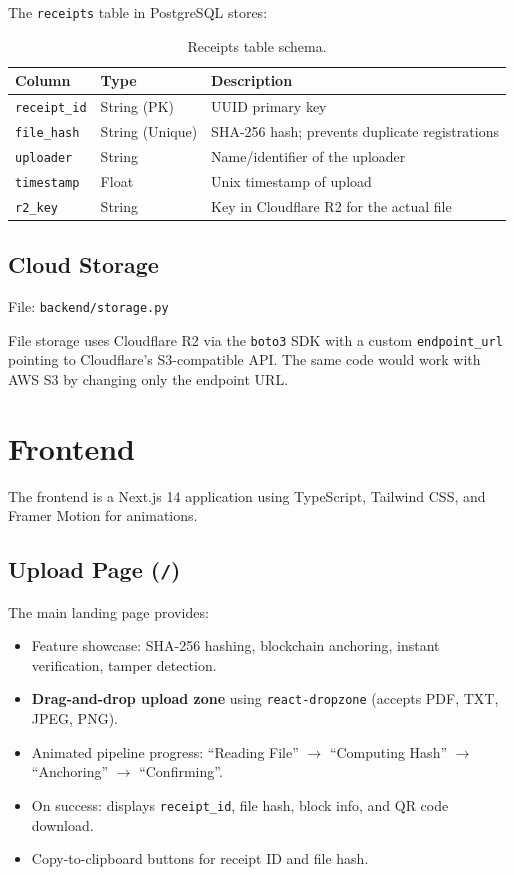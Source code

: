 \documentclass[12pt, a4paper]{report}
\begin{document}
The \texttt{receipts} table in PostgreSQL stores:

\begin{table}[H]
\centering
\begin{tabularx}{\textwidth}{l l X}
\toprule
\textbf{Column} & \textbf{Type} & \textbf{Description} \\
\midrule
\texttt{receipt\_id} & String (PK) & UUID primary key \\
\texttt{file\_hash} & String (Unique) & SHA-256 hash; prevents duplicate registrations \\
\texttt{uploader} & String & Name/identifier of the uploader \\
\texttt{timestamp} & Float & Unix timestamp of upload \\
\texttt{r2\_key} & String & Key in Cloudflare R2 for the actual file \\
\bottomrule
\end{tabularx}
\caption{Receipts table schema.}
\end{table}

\section{Cloud Storage}

File: \texttt{backend/storage.py}

File storage uses Cloudflare R2 via the \texttt{boto3} SDK with a custom
\texttt{endpoint\_url} pointing to Cloudflare's S3-compatible API. The same
code would work with AWS S3 by changing only the endpoint URL.


\chapter{Frontend}

The frontend is a Next.js 14 application using TypeScript, Tailwind CSS, and
Framer Motion for animations.

\section{Upload Page (\texttt{/})}

The main landing page provides:
\begin{itemize}
    \item Feature showcase: SHA-256 hashing, blockchain anchoring, instant
          verification, tamper detection.
    \item \textbf{Drag-and-drop upload zone} using \texttt{react-dropzone}
          (accepts PDF, TXT, JPEG, PNG).
    \item Animated pipeline progress: ``Reading File'' $\to$ ``Computing Hash''
          $\to$ ``Anchoring'' $\to$ ``Confirming''.
    \item On success: displays \texttt{receipt\_id}, file hash, block info, and
          QR code download.
    \item Copy-to-clipboard buttons for receipt ID and file hash.
\end{itemize}
\end{document}

